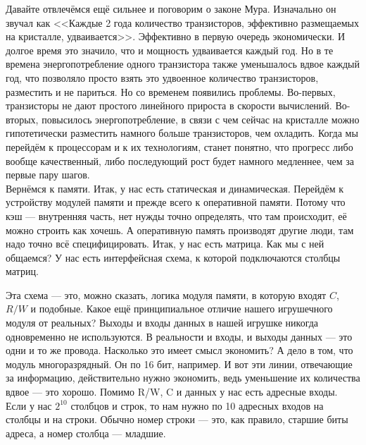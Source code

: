 \documentclass{article}
\begin{document}
    Давайте отвлечёмся ещё сильнее и поговорим о законе Мура. Изначально он звучал как <<Каждые 2 года количество транзисторов, эффективно размещаемых на кристалле, удваивается>>. Эффективно в первую очередь экономически. И долгое время это значило, что и мощность удваивается каждый год. Но в те времена энергопотребление одного транзистора также уменьшалось вдвое каждый год, что позволяло просто взять это удвоенное количество транзисторов, разместить и не париться. Но со временем появились проблемы. Во-первых, транзисторы не дают простого линейного прироста в скорости вычислений. Во-вторых, повысилось энергопотребление, в связи с чем сейчас на кристалле можно гипотетически разместить намного больше транзисторов, чем охладить. Когда мы перейдём к процессорам и к их технологиям, станет понятно, что прогресс либо вообще качественный, либо последующий рост будет намного медленнее, чем за первые пару шагов.\\
    Вернёмся к памяти. Итак, у нас есть статическая и динамическая. Перейдём к устройству модулей памяти и прежде всего к оперативной памяти. Потому что кэш --- внутренняя часть, нет нужды точно определять, что там происходит, её можно строить как хочешь. А оперативную память производят другие люди, там надо точно всё специфицировать. Итак, у нас есть матрица. Как мы с ней общаемся? У нас есть интерфейсная схема, к которой подключаются столбцы матриц.
    \begin{center}
    \end{center}
    Эта схема --- это, можно сказать, логика модуля памяти, в которую входят $C$, $R/W$ и подобные. Какое ещё принципиальное отличие нашего игрушечного модуля от реальных? Выходы и входы данных в нашей игрушке никогда одновременно не используются. В реальности и входы, и выходы данных --- это одни и то же провода. Насколько это имеет смысл экономить? А дело в том, что модуль многоразрядный. Он по 16 бит, например. И вот эти линии, отвечающие за информацию, действительно нужно экономить, ведь уменьшение их количества вдвое --- это хорошо. Помимо R/W, C и данных у нас есть адресные входы. Если у нас $2^{10}$ столбцов и строк, то нам нужно по 10 адресных входов на столбцы и на строки. Обычно номер строки --- это, как правило, старшие биты адреса, а номер столбца --- младшие.
\end{document}
